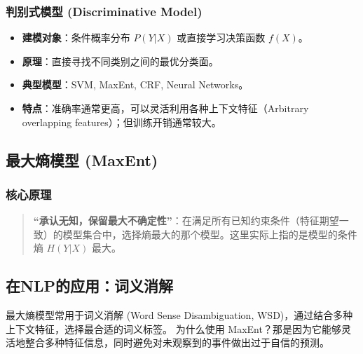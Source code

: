 \documentclass[a4paper, 11pt]{ctexart}
\begin{document}
\subsubsection{判别式模型 (Discriminative Model)}
\begin{itemize}
    \item \textbf{建模对象}：条件概率分布 $P(Y|X)$ 或直接学习决策函数 $f(X)$。
    \item \textbf{原理}：直接寻找不同类别之间的最优分类面。
    \item \textbf{典型模型}：SVM, MaxEnt, CRF, Neural Networks。
    \item \textbf{特点}：准确率通常更高，可以灵活利用各种上下文特征（Arbitrary overlapping features）；但训练开销通常较大。
\end{itemize}
\subsection{最大熵模型 (MaxEnt)}

\subsubsection{核心原理}
\begin{quote}
    \textbf{“承认无知，保留最大不确定性”}：在满足所有已知约束条件（特征期望一致）的模型集合中，选择熵最大的那个模型。这里实际上指的是模型的条件熵 $H(Y|X)$ 最大。
\end{quote}

\subsection{在NLP的应用：词义消解}
最大熵模型常用于词义消解 (Word Sense Disambiguation, WSD)，通过结合多种上下文特征，选择最合适的词义标签。
为什么使用 MaxEnt？那是因为它能够灵活地整合多种特征信息，同时避免对未观察到的事件做出过于自信的预测。
\end{document}
